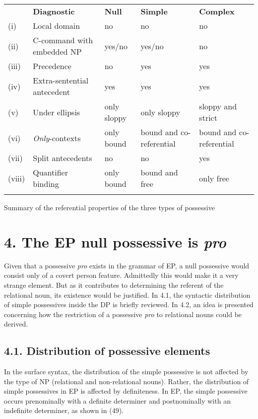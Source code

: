 \documentclass[output=paper]{langsci/langscibook}
\begin{document}
\begin{tabularx}{\textwidth}{XXXXX} & \textbf{Diagnostic} & \textbf{Null} & \textbf{Simple} & \textbf{Complex}\\
\lsptoprule
(i) & Local domain & no & no & no\\
(ii) & C-command with embedded NP & yes/no & yes/no & no\\
(iii) & Precedence & no & yes & yes\\
(iv) & Extra-sentential antecedent & yes & yes & yes\\
(v) & Under ellipsis & only sloppy & only sloppy & sloppy and strict\\
(vi) & \textit{Only}{}-contexts & only bound & bound and co-referential & bound and co-referential\\
(vii) & Split antecedents & no & no & yes\\
(viii) & Quantifier binding & only bound & bound and free & only free\\
\lspbottomrule
\end{tabularx}
\begin{table}
\caption{Summary of the referential properties of the three types of possessive}
\label{tab:key:2}
\end{table}

\section{ 4. The EP null possessive is \textit{pro}}

Given that a possessive \textit{pro} exists in the grammar of EP, a null possessive would consist only of a covert person feature. Admittedly this would make it a very strange element. But as it contributes to determining the referent of the relational noun, its existence would be justified. In 4.1, the syntactic distribution of simple possessives inside the DP is briefly reviewed. In 4.2, an idea is presented concerning how the restriction of a possessive \textit{pro} to relational nouns could be derived.

\subsection{ 4.1. Distribution of possessive elements}

In the surface syntax, the distribution of the simple possessive is not affected by the type of NP (relational and non-relational nouns). Rather, the distribution of simple possessives in EP is affected by definiteness. In EP, the simple possessive occurs prenominally with a definite determiner and postnominally with an indefinite determiner, as shown in (49).
\end{document}
